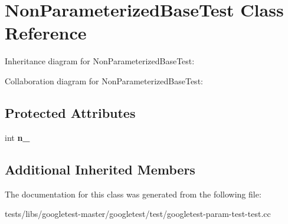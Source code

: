 \hypertarget{classNonParameterizedBaseTest}{}\section{Non\+Parameterized\+Base\+Test Class Reference}
\label{classNonParameterizedBaseTest}


Inheritance diagram for Non\+Parameterized\+Base\+Test\+:


Collaboration diagram for Non\+Parameterized\+Base\+Test\+:
\subsection*{Protected Attributes}
\begin{DoxyCompactItemize}
\item 
\mbox{\label{classNonParameterizedBaseTest_a617d4bbfd2aa5f6d41eea3089f7ad039}} 
int {\bfseries n\+\_\+}
\end{DoxyCompactItemize}
\subsection*{Additional Inherited Members}


The documentation for this class was generated from the following file\+:\begin{DoxyCompactItemize}
\item 
tests/libs/googletest-\/master/googletest/test/googletest-\/param-\/test-\/test.\+cc\end{DoxyCompactItemize}

